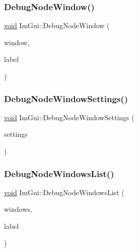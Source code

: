 \mbox{\label{namespaceImGui_afcb602554925c5409977f0fb39f77e5d}} 
\subsubsection{\texorpdfstring{Debug\+Node\+Window()}{DebugNodeWindow()}}
{\footnotesize\ttfamily \hyperlink{imgui__impl__opengl3__loader_8h_ac668e7cffd9e2e9cfee428b9b2f34fa7}{void} Im\+Gui\+::\+Debug\+Node\+Window (\begin{DoxyParamCaption}\item[{\hyperlink{structImGuiWindow}{Im\+Gui\+Window} $\ast$}]{window,  }\item[{const char $\ast$}]{label }\end{DoxyParamCaption})}

\mbox{\label{namespaceImGui_ad843ddd00b2e6f8182c2bac52bcd9bdc}} 
\subsubsection{\texorpdfstring{Debug\+Node\+Window\+Settings()}{DebugNodeWindowSettings()}}
{\footnotesize\ttfamily \hyperlink{imgui__impl__opengl3__loader_8h_ac668e7cffd9e2e9cfee428b9b2f34fa7}{void} Im\+Gui\+::\+Debug\+Node\+Window\+Settings (\begin{DoxyParamCaption}\item[{\hyperlink{structImGuiWindowSettings}{Im\+Gui\+Window\+Settings} $\ast$}]{settings }\end{DoxyParamCaption})}

\mbox{\label{namespaceImGui_a7eee954739d8052d1776cca0506f2500}} 
\subsubsection{\texorpdfstring{Debug\+Node\+Windows\+List()}{DebugNodeWindowsList()}}
{\footnotesize\ttfamily \hyperlink{imgui__impl__opengl3__loader_8h_ac668e7cffd9e2e9cfee428b9b2f34fa7}{void} Im\+Gui\+::\+Debug\+Node\+Windows\+List (\begin{DoxyParamCaption}\item[{\hyperlink{structImVector}{Im\+Vector}$<$ \hyperlink{structImGuiWindow}{Im\+Gui\+Window} $\ast$$>$ $\ast$}]{windows,  }\item[{const char $\ast$}]{label }\end{DoxyParamCaption})}

